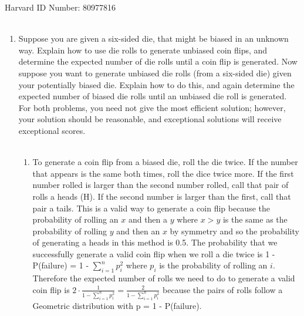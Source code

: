 \documentclass[11pt]{article}
\begin{document}
Harvard ID Number: 80977816 \\\\
\begin{enumerate}

\item Suppose you are given a six-sided die, that might be biased in
an unknown way. Explain how to use die rolls to generate unbiased coin
flips, and determine the expected number of die rolls until a coin
flip is generated.  Now suppose you want to generate unbiased die
rolls (from a six-sided die) given your potentially biased die.
Explain how to do this, and again determine the expected number of
biased die rolls until an unbiased die roll is generated.  For both
problems, you need not give the most efficient solution; however, your
solution should be reasonable, and exceptional solutions will receive
exceptional scores. \\\\
\begin{enumerate}
	\item To generate a coin flip from a biased die, roll the die twice.  If the number that appears is the same both times, roll the dice twice more.  If the first number rolled is larger than the second number rolled, call that pair of rolls a heads (H).  If the second number is larger than the first, call that pair a tails.  This is a valid way to generate a coin flip because the probability of rolling an $x$ and then a $y$ where $x > y$ is the same as the probability of rolling $y$ and then an $x$ by symmetry and so the probability of generating a heads in this method is 0.5.  The probability that we successfully generate a valid coin flip when we roll a die twice is 1 - P(failure) = 1 - $\displaystyle\sum_{i=1}^{n}p_{i}^2$ where $p_i$ is the probability of rolling an $i$.  Therefore the expected number of rolls we need to do to generate a valid coin flip is $2\cdot\frac{1}{1-\sum_{i=1}^{n}p_{i}^2} = \frac{2}{1-\sum_{i=1}^{n}p_{i}^2}$ because the pairs of rolls follow a Geometric distribution with p = 1 - P(failure).  
	

\end{enumerate}
\end{enumerate}
\end{document}
